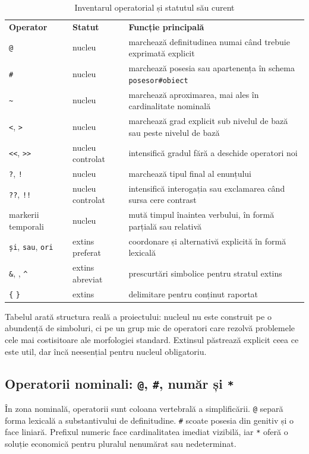 \documentclass[12pt,onecolumn,letterpaper]{article}
\newcommand{\rs}[1]{\texttt{#1}}
\newcommand{\RStablelayout}{%
\footnotesize
\setlength{\tabcolsep}{6pt}%
\renewcommand{\arraystretch}{1.12}%
\arrayrulecolor{RSRule}%
}
\begin{document}
\begin{table}[h!]
\centering
\RStablelayout
\begin{tabularx}{\linewidth}{@{}l l Y@{}}
\textbf{Operator} & \textbf{Statut} & \textbf{Funcție principală} \\
\rs{@} & nucleu & marchează definitudinea numai când trebuie exprimată explicit \\
\rs{\#} & nucleu & marchează posesia sau apartenența în schema \rs{posesor\#obiect} \\
\rs{\textasciitilde{}} & nucleu & marchează aproximarea, mai ales în cardinalitate nominală \\
\rs{<}, \rs{>} & nucleu & marchează grad explicit sub nivelul de bază sau peste nivelul de bază \\
\rs{<<}, \rs{>>} & nucleu controlat & intensifică gradul fără a deschide operatori noi \\
\rs{?}, \rs{!} & nucleu & marchează tipul final al enunțului \\
\rs{??}, \rs{!!} & nucleu controlat & intensifică interogația sau exclamarea când sursa cere contrast \\
markerii temporali & nucleu & mută timpul înaintea verbului, în formă parțială sau relativă \\
\rs{și}, \rs{sau}, \rs{ori} & extins preferat & coordonare și alternativă explicită în formă lexicală \\
\rs{\&}, \rs{\textbar{}}, \rs{\textasciicircum{}} & extins abreviat & prescurtări simbolice pentru stratul extins \\
\rs{\{} \rs{\}} & extins & delimitare pentru conținut raportat \\
\bottomrule
\end{tabularx}
\caption{Inventarul operatorial și statutul său curent}
\end{table}

Tabelul arată structura reală a proiectului: nucleul nu este construit pe o
abundență de simboluri, ci pe un grup mic de operatori care rezolvă problemele
cele mai costisitoare ale morfologiei standard. Extinsul păstrează explicit ceea
ce este util, dar încă neesențial pentru nucleul obligatoriu.

\subsection{Operatorii nominali: \rs{@}, \rs{\#}, număr și \rs{*}}

În zona nominală, operatorii sunt coloana vertebrală a simplificării.
\rs{@} separă forma lexicală a substantivului de definitudine. \rs{\#} scoate
posesia din genitiv și o face liniară. Prefixul numeric face cardinalitatea
imediat vizibilă, iar \rs{*} oferă o soluție economică pentru pluralul
nenumărat sau nedeterminat.
\end{document}
